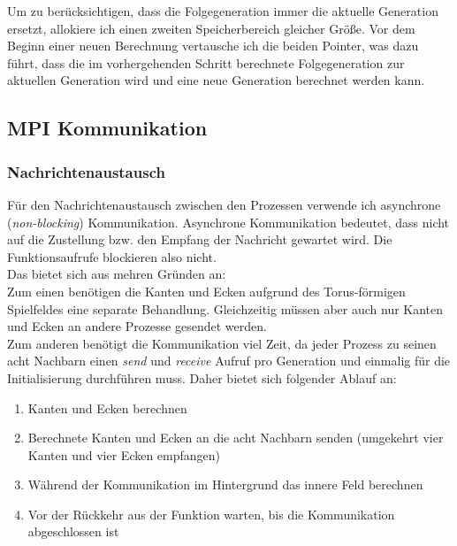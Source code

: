 \documentclass[german,plainarticle,hyperref,utf8]{zihpub}
\begin{document}
	Um zu berücksichtigen, dass die Folgegeneration immer die aktuelle Generation ersetzt, allokiere ich einen zweiten Speicherbereich gleicher Größe. Vor dem Beginn einer neuen Berechnung vertausche ich die beiden Pointer, was dazu führt, dass die im vorhergehenden Schritt berechnete Folgegeneration zur aktuellen Generation wird und eine neue Generation berechnet werden kann.
	
	\subsection{MPI Kommunikation}
	\subsubsection{Nachrichtenaustausch} \label{message}
	Für den Nachrichtenaustausch zwischen den Prozessen verwende ich asynchrone (\textit{non-blocking}) Kommunikation. Asynchrone Kommunikation bedeutet, dass nicht auf die Zustellung bzw. den Empfang der Nachricht gewartet wird. Die Funktionsaufrufe blockieren also nicht.\\
	Das bietet sich aus mehren Gründen an:\\
	Zum einen benötigen die Kanten und Ecken aufgrund des Torus-förmigen Spielfeldes eine separate Behandlung. Gleichzeitig müssen aber auch nur Kanten und Ecken an andere Prozesse gesendet werden.\\
	Zum anderen benötigt die Kommunikation viel Zeit, da jeder Prozess zu seinen acht Nachbarn einen \textit{send} und \textit{receive} Aufruf pro Generation und einmalig für die Initialisierung durchführen muss.
	Daher bietet sich folgender Ablauf an:
	\begin{enumerate}
		\item Kanten und Ecken berechnen
		\item Berechnete Kanten und Ecken an die acht Nachbarn senden (umgekehrt vier Kanten und vier Ecken empfangen)
		\item Während der Kommunikation im Hintergrund das innere Feld berechnen
		\item Vor der Rückkehr aus der Funktion warten, bis die Kommunikation abgeschlossen ist
	\end{enumerate}
	
\end{document}

